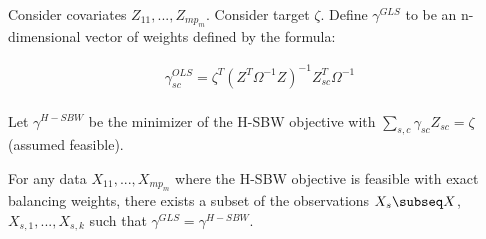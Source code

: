 \begin{proposition}
Consider covariates $Z_{11}, ..., Z_{mp_m}$. Consider target $\zeta$. Define $\gamma^{GLS}$ to be an n-dimensional vector of weights defined by the formula:

\begin{align*}
    \gamma_{sc}^{OLS} = \zeta^T(Z^T\Omega^{-1}Z)^{-1}Z_{sc}^T\Omega^{-1} \\
\end{align*}

Let $\gamma^{H-SBW}$ be the minimizer of the H-SBW objective with $\sum_{s,c}\gamma_{sc}Z_{sc} = \zeta$ (assumed feasible).

For any data $X_{11}, ..., X_{mp_m}$ where the H-SBW objective is feasible with exact balancing weights, there exists a subset of the observations $X_s \subseq X$, $X_{s, 1}, ..., X_{s, k}$ such that $\gamma^{GLS} = \gamma^{H-SBW}$.
\end{proposition}

